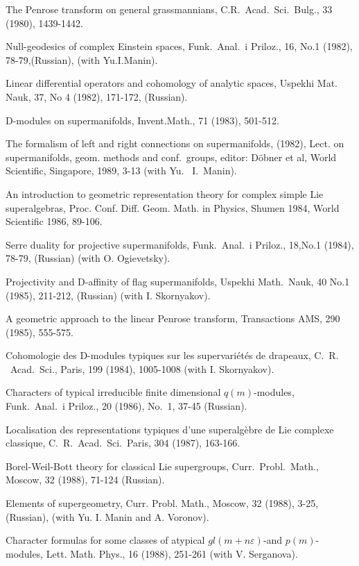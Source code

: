 \label{1.} The Penrose transform on general grassmannians,
C.R.~Acad.~Sci.~Bulg., 33 (1980), 1439-1442.

\myss \label{2.}  Null-geodesics of complex Einstein spaces,
Funk.~Anal.~i Priloz., 16, No.1 (1982), 78-79,(Russian), (with
Yu.I.Manin).

\myss \label{3.}  Linear differential operators and cohomology of
analytic spaces, Uspekhi Mat. Nauk, 37, No 4 (1982), 171-172,
(Russian).

\myss \label{4.} D-modules on supermanifolds, Invent.Math., 71
(1983), 501-512.

\myss \label{5.} The formalism of left and right connections on
supermanifolds, (1982), Lect. on supermanifolds, geom. methods and
conf.~groups, editor: D\"obner et al, World Scientific, Singapore,
1989, 3-13 (with Yu.~ I.~Manin).

\myss \label{6.} An introduction to geometric representation
theory for complex simple Lie superalgebras, Proc. Conf. Diff.
Geom. Math. in Physics, Shumen 1984, World Scientific 1986,
89-106.

\myss \label{7.} Serre duality for projective supermanifolds,
Funk.~Anal.~i Priloz., 18,No.1 (1984), 78-79, (Russian) (with O.
Ogievetsky).

\myss \label{8.} Projectivity and D-affinity of flag
supermanifolds, Uspekhi Math.~Nauk, 40 No.1 (1985), 211-212,
(Russian) (with I. Skornyakov).

\myss \label{9.} A geometric approach to the linear Penrose
transform, Transactions AMS, 290 (1985), 555-575.

\myss \label{10.} Cohomologie des D-modules typiques sur les
supervari\'et\'es de drapeaux, C.~R.\- ~Acad.~Sci., Paris, 199
(1984), 1005-1008 (with I. Skornyakov).

\myss \label{11.} Characters of typical irreducible finite
dimensional $q(m)$-modules, Funk.~Anal.~i Priloz., 20 (1986),
No.~1, 37-45 (Russian).

\myss \label{12.} Localisation des representations typiques d'une
superalg\`ebre de Lie complexe classique, C.~R.~Acad.~Sci.~Paris,
304 (1987), 163-166.

\myss \label{13.} Borel-Weil-Bott theory for classical Lie
supergroups, Curr.~Probl.~Math., Moscow, 32 (1988), 71-124
(Russian).

\myss \label{14.} Elements of supergeometry, Curr. Probl. Math.,
Moscow, 32 (1988), 3-25, (Russian), (with Yu. I. Manin and A.
Voronov).

\myss \label{15.} Character formulas for some classes of atypical
$gl(m+n\varepsilon)$-and $p(m)$-modules, Lett. Math. Phys., 16
(1988), 251-261 (with V. Serganova).

